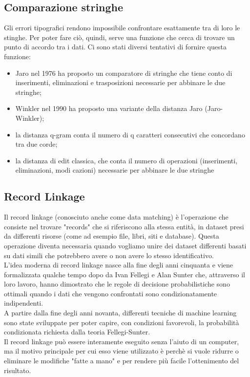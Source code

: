 \documentclass[a4paper,12pt]{article}
\begin{document}
\subsection{Comparazione stringhe}

Gli errori tipografici rendono impossibile confrontare esattamente tra di loro le stinghe.  Per poter fare ciò, quindi, serve una funzione che cerca di trovare un punto di accordo tra i dati. Ci sono stati diversi tentativi di fornire questa funzione:

\begin{itemize}
\item Jaro \cite{census/jaro76} nel 1976 ha proposto un comparatore di stringhe che tiene conto di inserimenti, eliminazioni e trasposizioni necessarie per abbinare le due stringhe;
\item Winkler \cite{winkler90} nel 1990 ha proposto una variante della distanza Jaro (Jaro-Winkler);
\item la distanza q-gram conta il numero di q caratteri consecutivi che concordano tra due corde;
\item la distanza di edit classica, che conta il numero di operazioni (inserimenti, eliminazioni, modi cazioni) necessarie per abbinare le due stringhe
\end{itemize}

\subsection{Record Linkage}

Il record linkage (conosciuto anche come data matching) è l'operazione che consiste nel trovare "records" che si riferiscono alla stessa entità, in dataset presi da differenti risorse (come ad esempio file, libri, siti e database). 
Questa operazione diventa necessaria quando vogliamo unire dei dataset differenti basati su dati simili che potrebbero avere o non avere lo stesso identificativo. \\
L'idea moderna di record linkage nasce alla fine degli anni cinquanta e viene formalizzata qualche tempo dopo da Ivan Fellegi e Alan Sunter \cite{fellegi69} che, attraverso il loro lavoro, hanno dimostrato che le regole di decisione probabilistiche sono ottimali quando i dati che vengono confrontati sono condizionatamente indipendenti. \\
A partire dalla fine degli anni novanta, differenti tecniche di machine learning sono state sviluppate per poter capire, con condizioni favorevoli, la probabilità condizionata richiesta dalla teoria Fellegi-Sunter. \\
Il record linkage può essere interamente eseguito senza l'aiuto di un computer, ma il motivo principale per cui esso viene utilizzato è perchè si vuole ridurre o eliminare le modifiche "fatte a mano" e per rendere più facile l'ottenimento del risultato. 
\\
\end{document}
